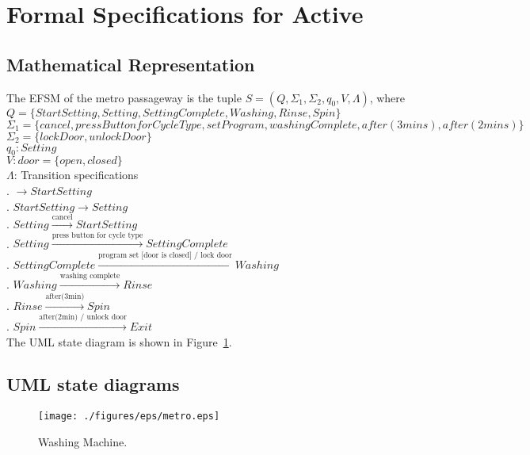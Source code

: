 \newpage
\section{Formal Specifications for Active}

\subsection{Mathematical Representation}

\noindent The EFSM of the metro passageway is the tuple $S = (Q, \Sigma_1, \Sigma_2, q_0, V, \Lambda)$, where\\

\noindent $Q = \{Start Setting, Setting, Setting Complete, Washing, Rinse, Spin\}$\\
\noindent $\Sigma_1 = \{cancel, press Button for Cycle Type, set Program, washing Complete, after(3 mins), after(2 mins)\}$\\
\noindent $\Sigma_2 = \{lock Door, unlock Door\}$\\
\noindent $q_0: Setting$\\
\noindent $V: door = \{open, closed\}$\\
\noindent $\Lambda$: Transition specifications\\
. $\rightarrow Start Setting$\\
. $Start Setting \rightarrow Setting$\\
. $Setting \xrightarrow {\text {cancel}} Start Setting$\\
. $Setting \xrightarrow {\text {press button for cycle type}} Setting Complete$\\
. $Setting Complete \xrightarrow {\text {program set [door is closed] / lock door}} Washing$\\
. $Washing \xrightarrow {\text {washing complete}} Rinse$\\
. $Rinse \xrightarrow {\text {after(3min)}} Spin$\\
. $Spin \xrightarrow {\text {after(2min) / unlock door}} Exit$\\

\noindent The UML state diagram is shown in Figure~\ref{fig:Active}.

\newpage

\subsection{UML state diagrams}

\begin{figure}[h!]
	\centering
		\texttt{[image: ./figures/eps/metro.eps]}
		  \caption{Washing Machine.}
  \label{fig:Active}
\end{figure}

